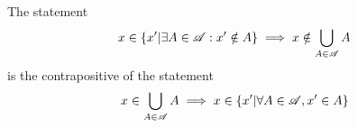 \documentclass[main.tex]{subfiles}
\begin{document}
\subproblem{}\label{6c}

\begin{remark}
	The statement
	\[x \in \{x'|\exists A \in \mathscr{A} : x' \notin A\} \implies x \notin \bigcup\limits_{A \in \mathscr{A}} {A}\]
	is the contrapositive of the statement
	\[x \in \bigcup\limits_{A \in \mathscr{A}} {A} \implies x \in \{x'|\forall A \in \mathscr{A}, x' \in A\}\]
\end{remark}
\end{document}
